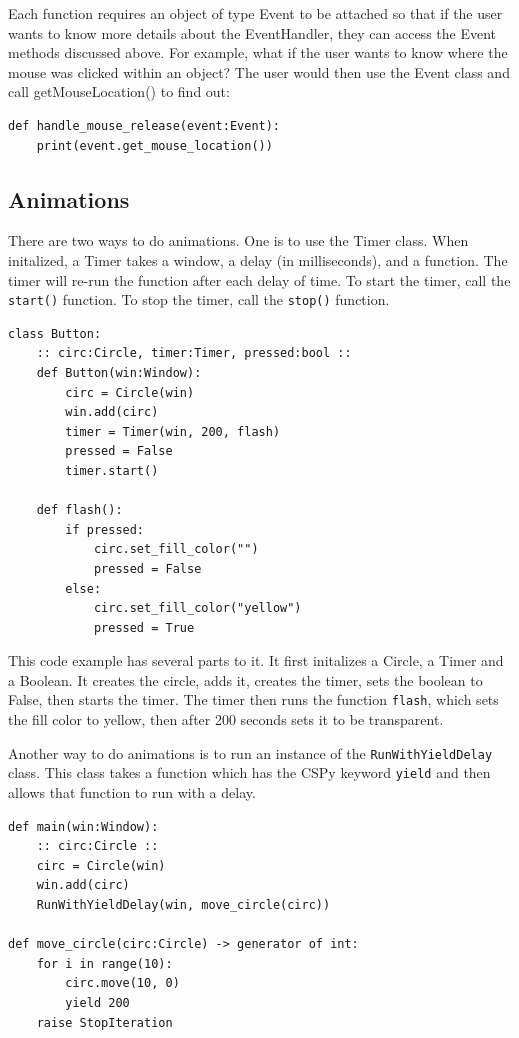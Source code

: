 \documentclass{article}
\begin{document}
Each function requires an object of type Event to be attached so that if the user wants to know more details about the EventHandler, they can access the Event methods discussed above. For example, what if the user wants to know where the mouse was clicked within an object? The user would then use the Event class and call getMouseLocation() to find out:

\begin{verbatim}
def handle_mouse_release(event:Event):
    print(event.get_mouse_location())
\end{verbatim}

\subsection{Animations}

There are two ways to do animations. One is to use the Timer class. When initalized, a Timer takes a window, a delay (in milliseconds), and a function. The timer will re-run the function after each delay of time. To start the timer, call the \verb|start()| function. To stop the timer, call the \verb|stop()| function.

\begin{verbatim}
class Button:
    :: circ:Circle, timer:Timer, pressed:bool ::
    def Button(win:Window):
        circ = Circle(win)
        win.add(circ)
        timer = Timer(win, 200, flash)
        pressed = False
        timer.start()

    def flash():
        if pressed:
            circ.set_fill_color("")
            pressed = False
        else:
            circ.set_fill_color("yellow")
            pressed = True
\end{verbatim}

This code example has several parts to it. It first initalizes a Circle, a Timer and a Boolean. It creates the circle, adds it, creates the timer, sets the boolean to False, then starts the timer. The timer then runs the function \verb|flash|, which sets the fill color to yellow, then after 200 seconds sets it to be transparent.

Another way to do animations is to run an instance of the \verb|RunWithYieldDelay| class. This class takes a function which has the CSPy keyword \verb|yield| and then allows that function to run with a delay.

\begin{verbatim}
def main(win:Window):
    :: circ:Circle ::
    circ = Circle(win)
    win.add(circ)
    RunWithYieldDelay(win, move_circle(circ))

def move_circle(circ:Circle) -> generator of int:
    for i in range(10):
        circ.move(10, 0)
        yield 200
    raise StopIteration
\end{verbatim}
\end{document}
